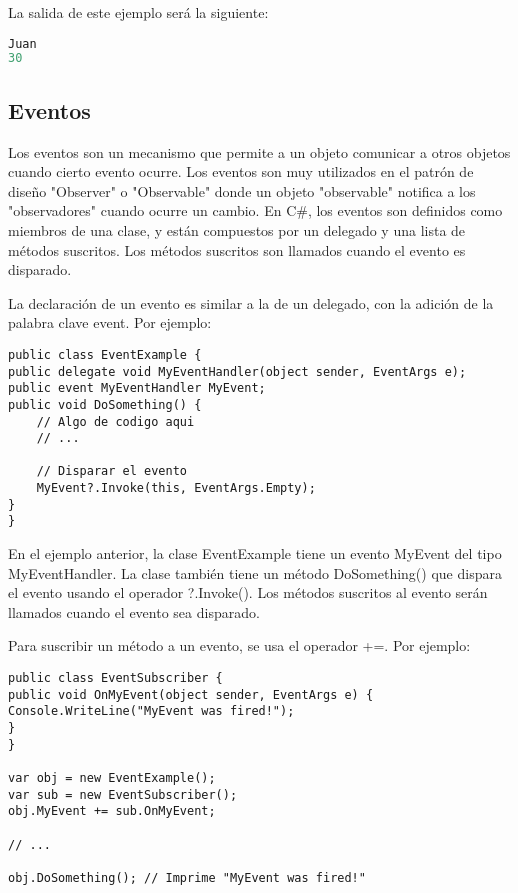 \documentclass[executivepaper]{article}
\begin{document}
La salida de este ejemplo será la siguiente:

\begin{lstlisting}[language=python]
Juan
30
\end{lstlisting}

\subsection{Eventos}

Los eventos son un mecanismo que permite a un objeto comunicar a otros objetos cuando cierto evento ocurre. Los eventos son muy utilizados en el patrón de diseño "Observer" o "Observable" donde un objeto "observable" notifica a los "observadores" cuando ocurre un cambio. En C\#, los eventos son definidos como miembros de una clase, y están compuestos por un delegado y una lista de métodos suscritos. Los métodos suscritos son llamados cuando el evento es disparado.

La declaración de un evento es similar a la de un delegado, con la adición de la palabra clave event. Por ejemplo:

\begin{lstlisting}
public class EventExample {
public delegate void MyEventHandler(object sender, EventArgs e);
public event MyEventHandler MyEvent;
public void DoSomething() {
    // Algo de codigo aqui
    // ...

    // Disparar el evento
    MyEvent?.Invoke(this, EventArgs.Empty);
}
}
\end{lstlisting}

En el ejemplo anterior, la clase EventExample tiene un evento MyEvent del tipo MyEventHandler. La clase también tiene un método DoSomething() que dispara el evento usando el operador ?.Invoke(). Los métodos suscritos al evento serán llamados cuando el evento sea disparado.

Para suscribir un método a un evento, se usa el operador +=. Por ejemplo:

\begin{lstlisting}
public class EventSubscriber {
public void OnMyEvent(object sender, EventArgs e) {
Console.WriteLine("MyEvent was fired!");
}
}

var obj = new EventExample();
var sub = new EventSubscriber();
obj.MyEvent += sub.OnMyEvent;

// ...

obj.DoSomething(); // Imprime "MyEvent was fired!"
\end{lstlisting}
\end{document}
